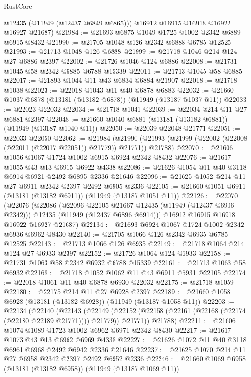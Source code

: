 \begin{lexlean}{RustCore}
\begin{coremodule}
        @12435
        (@11949 (@12437 @6849 @6865)))
      @16912
      @16915
      @16918
      @16922
      @16927
      @21687)
@21984 := @21693 @6875 @1049 @1725 @1002 @2342 @6889 @6915 @8432
@21990 := @21705 @1048 @126 @2342 @6888 @6785 @12525
@21993 := @21713 @1048 @126 @6888
@21999 := @21718 @1046 @214 @124 @27 @6886 @2397
@22002 := @21726 @1046 @124 @6886
@22008 := @21731 @1045 @58 @2342 @6885 @6788 @15339
@22011 := @21713 @1045 @58 @6885
@22017 := @21893 @1044 @11 @43 @6834 @6884 @21907
@22018 := @21718 @1038
@22023 := @22018 @1043 @11 @40 @6878 @6883
@22032 := @21660 @1037 @6878 (@13181 (@13182 @6878)) (@11949 (@13187 @1037 @11))
@22033 := @22023 @22032
@22034 := @21718 @1041
@22039 := @22034 @214 @11 @27 @6881 @2397
@22048 := @21660 @1040 @6881 (@13181 (@13182 @6881)) (@11949 (@13187 @1040 @11))
@22050 := @22039 @22048 @21771
@22051 := @22033 @22050
@22062 := @21984
    (@21990 (@21993 (@21999 (@22002 (@22008 (@22011 (@22017 @22051)) @21779)) @21771)) @21788)
@22070 := @21606 @1056 @1067 @1724 @1002 @6915 @6924 @2342 @8432
@22076 := @21617 @1055 @43 @13 @6915 @6922 @4338
@22086 := @21626 @1054 @11 @40 @3118 @6914 @6921 @2492 @6895 @2336 @21646
@22096 := @21625 @1052 @214 @11 @27 @6911 @2342 @2397 @2492 @6905 @2336
@22105 := @21660 @1051 @6911 (@13181 (@13182 @6911)) (@11949 (@13187 @1051 @11))
@22126 := @22070
    (@22076
      (@22086
        (@22096 @22105 @21667 @12435 (@11949 (@12437 @6906 @2342)))
        @12435
        (@11949 (@12437 @6896 @6914)))
      @16912
      @16915
      @16918
      @16922
      @16927
      @21687)
@22134 := @21693 @6924 @1067 @1724 @1002 @2342 @6936 @6962 @8430
@22140 := @21705 @1066 @126 @2342 @6935 @6785 @12525
@22143 := @21713 @1066 @126 @6935
@22149 := @21718 @1064 @214 @124 @27 @6933 @2397
@22152 := @21726 @1064 @124 @6933
@22158 := @21731 @1063 @58 @2342 @6932 @6788 @15339
@22161 := @21713 @1063 @58 @6932
@22168 := @21718 @1052 @1062 @11 @43 @6911 @6931 @22105
@22174 := @22018 @1061 @11 @40 @6878 @6930 @22032
@22175 := @21718 @1059
@22180 := @22175 @214 @11 @27 @6928 @2397
@22189 := @21660 @1058 @6928 (@13181 (@13182 @6928)) (@11949 (@13187 @1058 @11))
@22203 := @22134
    (@22140
      (@22143
        (@22149 (@22152 (@22158 (@22161 (@22168 (@22174 (@22180 @22189 @21771)))) @21779)) @21771))
      @21788)
@22211 := @21606 @1074 @1089 @1723 @1002 @6962 @6971 @2342 @8430
@22217 := @21617 @1073 @43 @13 @6962 @6969 @4338
@22227 := @21626 @1072 @11 @40 @3118 @6961 @6968 @2492 @6942 @2336 @21646
@22237 := @21625 @1070 @214 @11 @27 @6958 @2342 @2397 @2492 @6952 @2336
@22246 := @21660 @1069 @6958 (@13181 (@13182 @6958)) (@11949 (@13187 @1069 @11))

\end{coremodule}
\end{lexlean}
